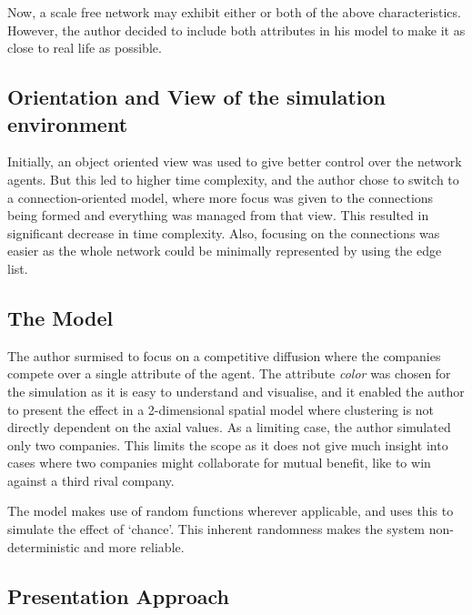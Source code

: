 Now, a scale free network may exhibit either or both of the above characteristics. However, the author decided to include both attributes in his model to make it as close to real life as possible. 

\subsection{Orientation and View of the simulation environment}

Initially, an object oriented view was used to give better control over the network agents. But this led to higher time complexity, and the author chose to switch to a connection-oriented model, where more focus was given to the connections being formed and everything was managed from that view. This resulted in significant decrease in time complexity.
Also, focusing on the connections was easier as the whole network could be minimally represented by using the edge list.



\subsection{The Model}
The author surmised to focus on a competitive diffusion where the companies compete over a single attribute of the agent. The attribute \emph{color} was chosen for the simulation as it is easy to understand and visualise, and it enabled the author to present the effect in a 2-dimensional spatial model where clustering is not directly dependent on the axial values. 
As a limiting case, the author simulated only two companies. This limits the scope as it does not give much insight into cases where two companies might collaborate for mutual benefit, like to win against a third rival company.

The model makes use of random functions wherever applicable, and uses this to simulate the effect of `chance'. This inherent randomness makes the system non-deterministic and more reliable.



\subsection{Presentation Approach}
\label{sec:presentaion}

